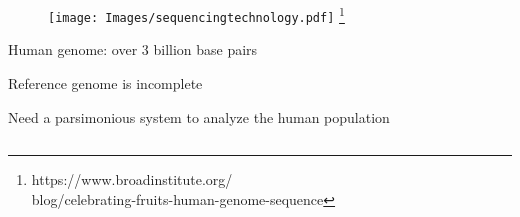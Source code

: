 \documentclass[10pt,dvipsnames,table]{beamer}
\begin{document}
\begin{frame}
\begin{columns}[t]
\begin{column}{0.4\textwidth}
\begin{center}
\begin{figure}[t]
\texttt{[image: Images/sequencingtechnology.pdf]} \footnote{\tiny{https://www.broadinstitute.org/ \\blog/celebrating-fruits-human-genome-sequence}}
\end{figure}
\end{center}

\begin{itemize}
{\small{
\item Human genome: over 3 billion base pairs

\item Reference genome is incomplete
 
\item Need a parsimonious system to analyze the human population
}}
\end{itemize}
\end{column}

\end{columns}
\note{}
\end{frame}
\end{document}
